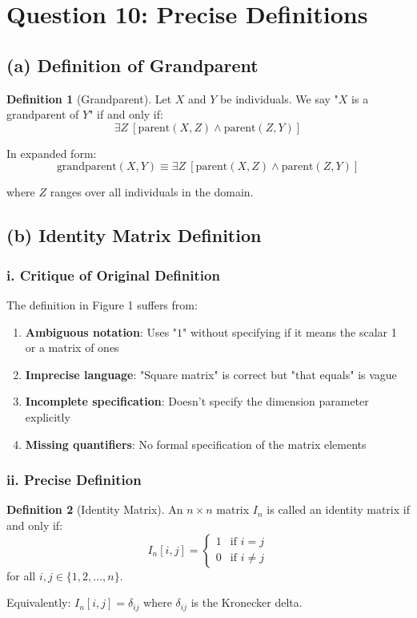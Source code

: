 \documentclass[12pt]{article}
\theoremstyle{definition}
\newtheorem{definition}{Definition}
\begin{document}
\section*{Question 10: Precise Definitions}

\subsection*{(a) Definition of Grandparent}
\begin{definition}[Grandparent]
Let $X$ and $Y$ be individuals. We say "$X$ is a grandparent of $Y$" if and only if:
\[\exists Z \: [\text{parent}(X, Z) \wedge \text{parent}(Z, Y)]\]

In expanded form:
\[\text{grandparent}(X, Y) \equiv \exists Z \: [\text{parent}(X, Z) \wedge \text{parent}(Z, Y)]\]

where $Z$ ranges over all individuals in the domain.
\end{definition}

\subsection*{(b) Identity Matrix Definition}

\subsubsection*{i. Critique of Original Definition}
The definition in Figure 1 suffers from:
\begin{enumerate}
    \item \textbf{Ambiguous notation}: Uses "$1$" without specifying if it means the scalar 1 or a matrix of ones
    \item \textbf{Imprecise language}: "Square matrix" is correct but "that equals" is vague
    \item \textbf{Incomplete specification}: Doesn't specify the dimension parameter explicitly
    \item \textbf{Missing quantifiers}: No formal specification of the matrix elements
\end{enumerate}

\subsubsection*{ii. Precise Definition}
\begin{definition}[Identity Matrix]
An $n \times n$ matrix $I_n$ is called an identity matrix if and only if:
\[I_n[i,j] = \begin{cases}
1 & \text{if } i = j \\
0 & \text{if } i \neq j
\end{cases}\]
for all $i, j \in \{1, 2, ..., n\}$.

Equivalently: $I_n[i,j] = \delta_{ij}$ where $\delta_{ij}$ is the Kronecker delta.
\end{definition}
\end{document}
